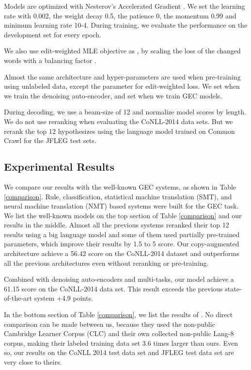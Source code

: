 \documentclass[11pt,a4paper]{article}
\begin{document}
Models are optimized with Nesterov’s Accelerated Gradient \cite{nesterov1983method}. We set the learning rate with 0.002, the weight decay 0.5, the patience 0, the momentum 0.99 and minimum learning rate 10-4. During training, we evaluate the performance on the development set for every epoch.


We also use edit-weighted MLE objective as \cite{junczys2018approaching}, by scaling the loss of the changed words with a balancing factor .

Almost the same architecture and hyper-parameters are used when pre-training using unlabeled data, except the  parameter for edit-weighted loss. We set  when we train the denoising auto-encoder, and set  when we train GEC models. 

During decoding, we use a beam-size of 12 and normalize model scores by length. We do not use reranking when evaluating the CoNLL-2014 data sets. But we rerank the top 12 hypothesizes using the language model trained on Common Crawl \cite{junczys2016phrase} for the JFLEG test sets.



\subsection{Experimental Results}
We compare our results with the well-known GEC systems, as shown in Table \ref{comparison}. Rule, classification, statistical machine translation (SMT), and neural machine translation (NMT) based systems were built for the GEC task. We list the well-known models on the top section of Table \ref{comparison} and our results in the middle. Almost all the previous systems reranked their top 12 results using a big language model and some of them used partially pre-trained parameters, which improve their results by 1.5 to 5  score.  Our copy-augmented architecture achieve a 56.42  score on the CoNLL-2014 dataset and outperforms all the previous architectures even without reranking or pre-training. 

Combined with denoising auto-encoders and multi-tasks, our model achieve a 61.15  score on the CoNLL-2014 data set. This result exceeds the previous state-of-the-art system +4.9  points.

In the bottom section of Table \ref{comparison}, we list the results of \cite{ge2018reaching}. No direct comparison can be made between us, because they used the non-public Cambridge Learner Corpus (CLC) \cite{nicholls2003cambridge} and their own collected non-public Lang-8 corpus, making their labeled training data set 3.6 times larger than ours. Even so, our results on the CoNLL 2014 test data set and JFLEG test data set are very close to theirs.
\end{document}
